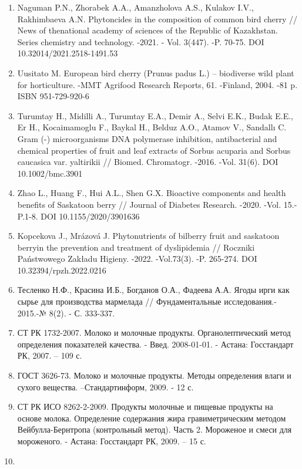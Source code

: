 {{\begin{enumerate}
\def\labelenumi{\arabic{enumi}.}
\setcounter{enumi}{5}
\item
  Naguman P.N., Zhorabek A.A., Amanzholova A.S., Kulakov I.V.,
  Rakhimbaeva A.N. Phytoncides in the composition of common bird cherry
  // News of thenational academy of sciences of the Republic of
  Kazakhstan. Series chemistry and technology. -2021. - Vol. 3(447). -P.
  70-75. DOI 10.32014/2021.2518-1491.53
\item
  Uusitato M. European bird cherry (Prunus padus L.) -- biodiverse wild
  plant for horticulture. -MMT Agrifood Research Reports, 61. -Finland,
  2004. -81 p. ISBN 951-729-920-6
\item
  Turumtay H., Midilli A., Turumtay E.A., Demir A., Selvi E.K., Budak
  E.E., Er H., Kocaimamoglu F., Baykal H., Belduz A.O., Atamov V.,
  Sandallı C. Gram (-) microorganisms DNA polymerase inhibition,
  antibacterial and chemical properties of fruit and leaf extracts of
  Sorbus acuparia and Sorbus caucasica var. yaltirikii // Biomed.
  Chromatogr. -2016. -Vol. 31(6). DOI 10.1002/bmc.3901
\item
  Zhao L., Huang F., Hui A.L., Shen G.X. Bioactive components and health
  benefits of Saskatoon berry // Journal of Diabetes Research. -2020.
  -Vol. 15.- P.1-8. DOI 10.1155/2020/3901636
\item
  Kopcekova J., Mrázová J. Phytonutrients of bilberry fruit and
  saskatoon berryin the prevention and treatment of dyslipidemia //
  Roczniki Państwowego Zakładu Higieny. -2022. -Vol.73(3). -P. 265-274.
  DOI 10.32394/rpzh.2022.0216
\item
  Тесленко Н.Ф., Красина И.Б., Богданов О.А., Фадеева А.А. Ягоды ирги
  как сырье для производства мармелада // Фундаментальные исследования.-
  2015.-№ 8(2). - С. 333-337.
\item
  СТ РК 1732-2007. Молоко и молочные продукты. Органолептический метод
  определения показателей качества. - Введ. 2008-01-01. - Астана:
  Госстандарт РК, 2007. -- 109 с.
\item
  ГОСТ 3626-73. Молоко и молочные продукты. Методы определения влаги и
  сухого вещества. --Стандартинформ, 2009. - 12 с.
\item
  СТ РК ИСО 8262-2-2009. Продукты молочные и пищевые продукты на основе
  молока. Определение содержания жира гравиметрическим методом
  Вейбулла-Бернтропа (контрольный метод). Часть 2. Мороженое и смеси для
  мороженого. - Астана: Госстандарт РК, 2009. -- 15 с.
\item

\end{enumerate}}}
